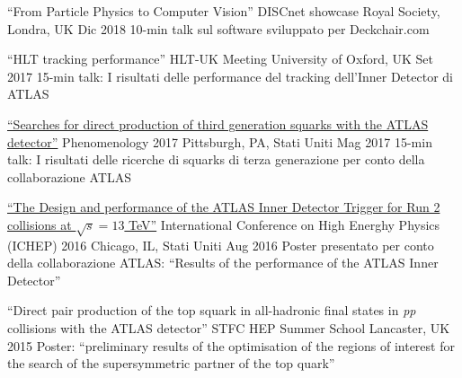 \begin{cventries}
  \cventry
    {``From Particle Physics to Computer Vision''}
    {DISCnet showcase}
    {Royal Society, Londra, UK}
    {Dic 2018}
    {10-min talk sul software sviluppato per Deckchair.com}

  \cventry
    {``HLT tracking performance''}
    {HLT-UK Meeting}
    {University of Oxford, UK}
    {Set 2017}
    {15-min talk: I risultati delle performance del tracking dell'Inner Detector di ATLAS }

  \cventry
    {
    \href{http://cds.cern.ch/record/2263055/files/ATL-PHYS-SLIDE-2017-220.pdf}{``Searches for direct production of third generation squarks with the ATLAS detector''}
    }
    {Phenomenology 2017}
    {Pittsburgh, PA, Stati Uniti}
    {Mag 2017}
    {15-min talk: I risultati delle ricerche di squarks di terza generazione per conto della collaborazione ATLAS}

  \cventry
    {
    \href{https://indico.cern.ch/event/432527/contributions/1071672/attachments/1317672/1974610/FMiano-IDTrigger-ICHEP.pdf}
    {``The Design and performance of the ATLAS Inner Detector Trigger for Run 2 collisions at $\sqrt{s} = 13$ TeV''}
    }
    {International Conference on High Energhy Physics (ICHEP) 2016}
    {Chicago, IL, Stati Uniti}
    {Aug 2016}
    {Poster presentato per conto della collaborazione ATLAS: ``Results of the performance of the ATLAS Inner Detector''}

  \cventry
    {``Direct pair production of the top squark in all-hadronic final states in \emph{pp} collisions with the ATLAS detector''}
    {STFC HEP Summer School}
    {Lancaster, UK}
    {2015}
    {Poster: ``preliminary results of the optimisation of the regions of interest for the search of the supersymmetric partner of the top quark''}

\end{cventries}